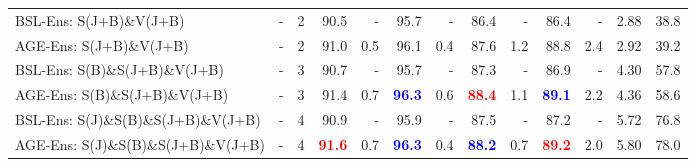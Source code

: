 \documentclass[journal,comsoc]{IEEEtran}
\def\ange{AGE}
\begin{document}
\begin{table*}[t]
{\begin{tabular}{l c c | rrrr | rrrr | r r}
\midrule 
\rowcolor{Gray!30}
BSL-Ens: S(J+B)\&V(J+B) & - & 2 & 90.5 & - & 95.7 & - & 86.4 & - & 86.4 & - & 2.88 & 38.8 \\ 
\ange{}-Ens: S(J+B)\&V(J+B) & - & 2 & 91.0 & 0.5 & 96.1 & 0.4 & 87.6 & 1.2 &  88.8 & 2.4 & 2.92 & 39.2 \\ 
\midrule 
\rowcolor{Gray!30}
BSL-Ens: S(B)\&S(J+B)\&V(J+B) & - & 3 & 90.7 & - & 95.7 & - & 87.3 & - & 86.9 & - & 4.30 & 57.8 \\ 
\ange{}-Ens: S(B)\&S(J+B)\&V(J+B) & - & 3 & 91.4 & 0.7 & \textbf{\textcolor{blue}{96.3}} & 0.6 & \textbf{\textcolor{red}{88.4}} & 1.1 & \textbf{\textcolor{blue}{89.1}} & 2.2 & 4.36 & 58.6 \\ 
\midrule 
\rowcolor{Gray!30}
BSL-Ens: S(J)\&S(B)\&S(J+B)\&V(J+B) & - & 4 & 90.9 & - & 95.9 & - & 87.5 & - & 87.2 & - & 5.72 & 76.8 \\ 
\ange{}-Ens: S(J)\&S(B)\&S(J+B)\&V(J+B) & - & 4 & \textbf{\textcolor{red}{91.6}} & 0.7 & \textbf{\textcolor{blue}{96.3}} & 0.4 & \textbf{\textcolor{blue}{88.2}} & 0.7 & \textbf{\textcolor{red}{89.2}} & 2.0 & 5.80 & 78.0 \\ 
\bottomrule
\end{tabular}
}
\label{tab:compare_with_sota}
\end{table*} \begin{table}[t]
\centering
\caption{Evaluation results on ensembling with angular features. Ens is the ensembling. Jnt and Bon represent the joint and bone features respectively. The red bold number highlights the highest prediction accuracy. Acc$\uparrow$ is the improvement in accuracy. } 
\label{table:ang_feature_ens}
\end{table}
\end{document}
